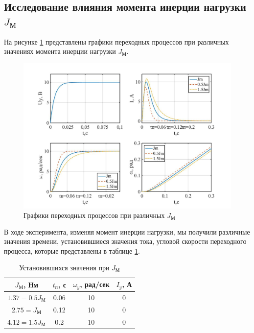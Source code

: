 \documentclass[a4paper, 12pt]{article}
\begin{document}
\newpage
\begin{center}
\section{Исследование влияния момента инерции нагрузки $J_\text{М}$}
\end{center}
На рисунке \ref{Jm} представлены графики переходных процессов при различных значениях момента инерции нагрузки $J_\text{М}$.

\begin{figure}[h!]
	\centering
	\includegraphics[width = 1\textwidth]{data/Jm}
	\caption{Графики переходных процессов при различных $J_\text{М}$}
	\label{Jm}
\end{figure}

В ходе эксперимента, изменяя момент инерции нагрузки, мы получили различные значения времени, установившиеся значения тока, угловой скорости переходного процесса, которые представлены в таблице \ref{tab:Jm}.

\begin{table}[h!]
	\centering
	\begin{threeparttable}
		\caption{Установившихся значения при $J_\text{М}$}
		\begin{tabular}{|c|c|c|c|}
			\hline
			$J_\text{М}$, Нм	&	$t_\text{п}$, с	&	$\omega_y$, рад/сек	&	$I_y$, А\\
			\hline
			$1.37=0.5J_\text{М}$		&	0.06	&	10		&	0\\
			\hline
			$2.75=J_\text{М}$		&	0.12	&	10		&	0\\
			\hline
			$4.12=1.5J_\text{М}$		&	0.2		&	10		&	0\\
			\hline			
		\end{tabular}
		\label{tab:Jm}
	\end{threeparttable}
\end{table}
\end{document}
